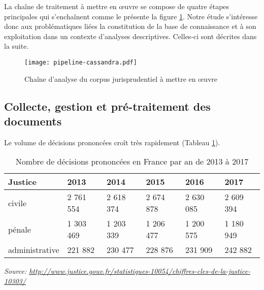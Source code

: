  La chaîne de traitement à mettre en \oe uvre se compose de quatre étapes principales qui s'enchaînent comme le présente la figure \ref{fig:intro:pipeline-globale}. Notre étude s'intéresse donc aux problématiques liées la constitution de la base de connaissance et à son exploitation dans un contexte d'analyses descriptives. Celles-ci sont décrites dans la suite.
\begin{figure}
	\texttt{[image: pipeline-cassandra.pdf]}
	\caption{Chaîne d'analyse du corpus jurisprudentiel à mettre en \oe uvre} \label{fig:intro:pipeline-globale}
\end{figure} 


\subsection{Collecte, gestion et pré-traitement des documents}

 Le volume de décisions prononcées croît très rapidement (Tableau \ref{tab:intro:nbdecisionstats}). 
 
 \begin{table}[!htb]
 	\small
 	\begin{center}
 		\begin{tabular}{|l|l|l|l|l|l|}
 			\hline
 			\textbf{Justice}	& \textbf{2013}      & \textbf{2014}      & \textbf{2015}      & \textbf{2016}      & \textbf{2017}      \\ \hline
 			civile         & 2 761 554 & 2 618 374 & 2 674 878 & 2 630 085 & 2 609 394 \\ \hline
 			pénale         & 1 303 469 & 1 203 339 & 1 206 477 & 1 200 575 & 1 180 949 \\ \hline
 			administrative & 221 882   & 230 477   & 228 876   & 231 909   & 242 882   \\ \hline
 		\end{tabular}
 		
 		\textit{\scriptsize{Source: \url{http://www.justice.gouv.fr/statistiques-10054/chiffres-cles-de-la-justice-10303/}}}  
 	\end{center}
 	\caption{Nombre de décisions prononcées en France par an de 2013 à 2017}\label{tab:intro:nbdecisionstats}
 \end{table}
 
